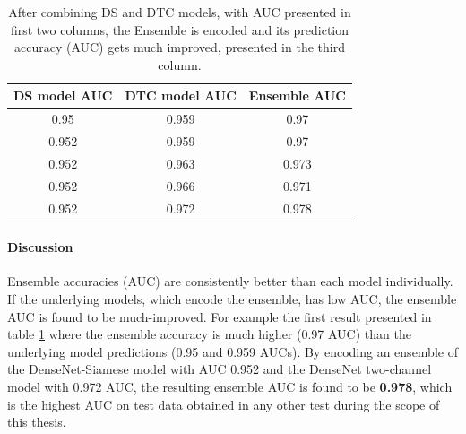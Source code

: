 \begin{table}[ht]
\centering
\caption{After combining DS and DTC models, with AUC presented in first two columns, the Ensemble is encoded and its prediction accuracy (AUC) gets much improved, presented in the third column.}
\resizebox{0.7\textwidth}{!}
{\begin{tabular}{|c c c|} 
\rowcolor{lightgrey}
 \hline\hline
 DS model AUC &  DTC model AUC &  Ensemble AUC\\ [0.5ex]
 \hline
 0.95 & 0.959 & 0.97\\ \hline
 0.952 &  0.959 &  0.97\\ \hline
 0.952 &  0.963 &  0.973\\ \hline
 0.952 &  0.966 &  0.971\\ \hline
 0.952 &  0.972 &  0.978\\
 \hline \hline
 \end{tabular}}
\label{table:Ensemble}
\end{table}

\paragraph{Discussion\\}
Ensemble accuracies (AUC) are consistently better than each model individually. If the underlying models, which encode the ensemble, has low AUC, the ensemble AUC is found to be much-improved. For example the first result presented in 
table \ref{table:Ensemble} where the ensemble accuracy is much higher (0.97 AUC) than the underlying model predictions (0.95 and 0.959 AUCs). By encoding an ensemble of the DenseNet-Siamese model with AUC 0.952 and the DenseNet two-channel
model with 0.972 AUC, the resulting ensemble AUC is found to be \textbf{0.978}, which is the highest AUC on test data obtained in any other test during the scope of this thesis.
